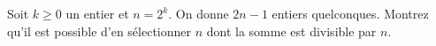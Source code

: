 Soit $k \geq 0$ un entier et $n = 2^k$. On donne $2n - 1$ entiers quelconques.
Montrez qu'il est possible d'en sélectionner $n$ dont la somme est divisible
par $n$.
